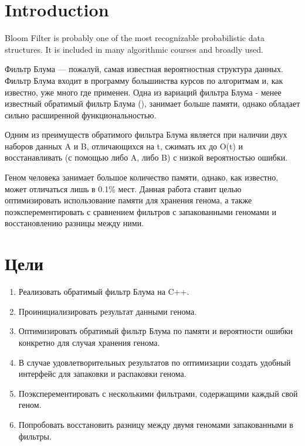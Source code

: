 \documentclass{article}
\begin{document}
\makeTitlePage

\tableofcontents


\section{Introduction}

Bloom Filter is probably one of the most recognizable probabilistic data
structures. It is included in many algorithmic courses and broadly used.


Фильтр Блума --- пожалуй, самая известная вероятностная структура данных. Фильтр Блума входит в программу 
большинства курсов по алгоритмам и, как известно, уже много где применен. Одна из вариаций фильтра Блума -
менее известный обратимый фильтр Блума (\textcite{GoMi2011}), занимает больше памяти, однако обладает сильно расширенной функциональностью.

Одним из преимуществ обратимого фильтра Блума является при наличии двух наборов данных A и B,
отличающихся на t, сжимать их до O(t) и восстанавливать (с помощью либо A, либо B) с низкой вероятностью ошибки.

Геном человека занимает большое количество памяти, однако, как известно, может отличаться лишь в 0.1\% мест.
Данная работа ставит целью оптимизировать использование памяти для хранения генома, а также поэксперементировать с сравнением фильтров с запакованными геномами и восстановлению разницы между ними. 

\section{Цели}
\begin{enumerate}
    \item Реализовать обратимый фильтр Блума на C++.
    \item Проинициализировать результат данными генома.
    \item Оптимизировать обратимый фильтр Блума по памяти и вероятности ошибки конкретно для случая хранения генома.
    \item В случае удовлетворительных результатов по оптимизации создать удобный интерфейс для запаковки и распаковки генома.
    \item Поэксперементировать с несколькими фильтрами, содержащими каждый свой геном.
    \item Попробовать восстановить разницу между двумя геномами запакованными в фильтры.
\end{enumerate}
\end{document}

